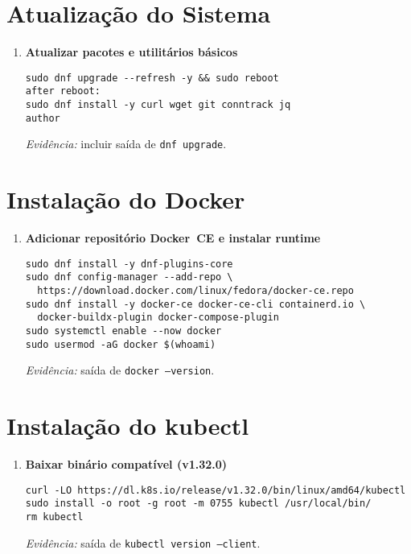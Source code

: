\documentclass[12pt,a4paper]{report}
\begin{document}
\section{Atualização do Sistema}
\begin{enumerate}[label=\arabic*.]
  \item \textbf{Atualizar pacotes e utilitários básicos}
\begin{verbatim}
sudo dnf upgrade --refresh -y && sudo reboot
after reboot:
sudo dnf install -y curl wget git conntrack jq
author
\end{verbatim}
\textit{Evidência:} incluir saída de \texttt{dnf upgrade}.\\
\vspace{3cm}
\end{enumerate}

\section{Instalação do Docker}
\begin{enumerate}[label=\arabic*.]
\item\textbf{Adicionar repositório Docker CE e instalar runtime}
\begin{verbatim}
sudo dnf install -y dnf-plugins-core
sudo dnf config-manager --add-repo \
  https://download.docker.com/linux/fedora/docker-ce.repo
sudo dnf install -y docker-ce docker-ce-cli containerd.io \
  docker-buildx-plugin docker-compose-plugin
sudo systemctl enable --now docker
sudo usermod -aG docker $(whoami)
\end{verbatim}
\textit{Evidência:} saída de \texttt{docker --version}.\\
\vspace{3cm}
\end{enumerate}

\section{Instalação do kubectl}
\begin{enumerate}[label=\arabic*.]
\item\textbf{Baixar binário compatível (v1.32.0)}
\begin{verbatim}
curl -LO https://dl.k8s.io/release/v1.32.0/bin/linux/amd64/kubectl
sudo install -o root -g root -m 0755 kubectl /usr/local/bin/
rm kubectl
\end{verbatim}
\textit{Evidência:} saída de \texttt{kubectl version --client}.\\
\vspace{2cm}
\end{enumerate}
\end{document}
